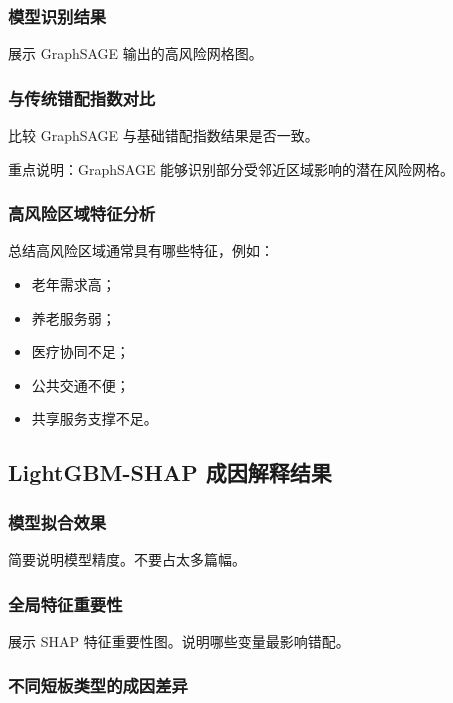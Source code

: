\subsubsection{模型识别结果}

展示 GraphSAGE 输出的高风险网格图。

\subsubsection{与传统错配指数对比}

比较 GraphSAGE 与基础错配指数结果是否一致。

重点说明：GraphSAGE 能够识别部分受邻近区域影响的潜在风险网格。

\subsubsection{高风险区域特征分析}

总结高风险区域通常具有哪些特征，例如：

\begin{itemize}
\item 老年需求高；
\item 养老服务弱；
\item 医疗协同不足；
\item 公共交通不便；
\item 共享服务支撑不足。
\end{itemize}

\subsection{LightGBM-SHAP 成因解释结果}

\subsubsection{模型拟合效果}

简要说明模型精度。不要占太多篇幅。

\subsubsection{全局特征重要性}

展示 SHAP 特征重要性图。说明哪些变量最影响错配。

\subsubsection{不同短板类型的成因差异}

